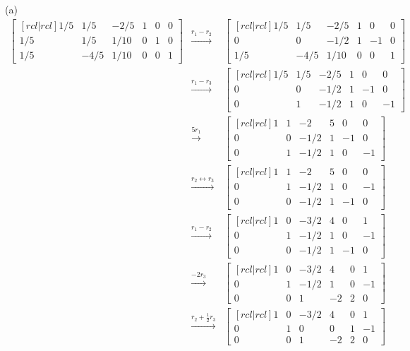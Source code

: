 \begin{solution}
(a) 
\begin{eqnarray*}
\begin{bmatrix}[rcl|rcl]
1/5&1/5&-2/5&1&0&0\\
1/5&1/5&1/10&0&1&0\\
1/5&-4/5&1/10&0&0&1
\end{bmatrix}
&\xrightarrow[]{r_1 - r_2}&
\begin{bmatrix}[rcl|rcl]
1/5&1/5&-2/5&1&0&0\\
0&0&-1/2&1&-1&0\\
1/5&-4/5&1/10&0&0&1
\end{bmatrix}\\
&\xrightarrow[]{r_1 - r_3}&
\begin{bmatrix}[rcl|rcl]
1/5&1/5&-2/5&1&0&0\\
0&0&-1/2&1&-1&0\\
0&1&-1/2&1&0&-1
\end{bmatrix}\\
&\xrightarrow[]{5r_1}&
\begin{bmatrix}[rcl|rcl]
1&1&-2&5&0&0\\
0&0&-1/2&1&-1&0\\
0&1&-1/2&1&0&-1
\end{bmatrix}\\
&\xrightarrow[]{r_2 \leftrightarrow r_3}&
\begin{bmatrix}[rcl|rcl]
1&1&-2&5&0&0\\
0&1&-1/2&1&0&-1\\
0&0&-1/2&1&-1&0
\end{bmatrix}\\
&\xrightarrow[]{r_1- r_2}&
\begin{bmatrix}[rcl|rcl]
1&0&-3/2&4&0&1\\
0&1&-1/2&1&0&-1\\
0&0&-1/2&1&-1&0
\end{bmatrix}\\
&\xrightarrow[]{-2r_3}&
\begin{bmatrix}[rcl|rcl]
1&0&-3/2&4&0&1\\
0&1&-1/2&1&0&-1\\
0&0&1&-2&2&0
\end{bmatrix}\\
&\xrightarrow[]{r_2 + \frac{1}{2}r_3}&
\begin{bmatrix}[rcl|rcl]
1&0&-3/2&4&0&1\\
0&1&0&0&1&-1\\
0&0&1&-2&2&0
\end{bmatrix}\\

\end{eqnarray*}
\end{solution}
